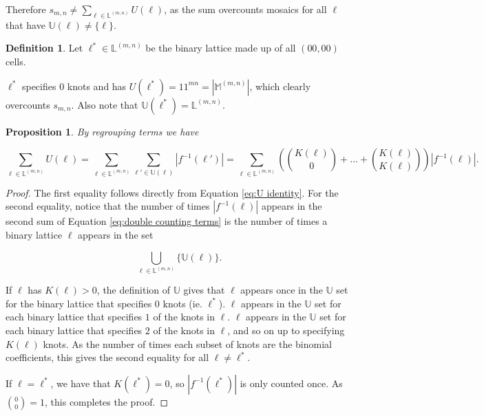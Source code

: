 \documentclass[12pt]{article}
\theoremstyle{plain}
\newtheorem{prop}[thm]{Proposition}
\theoremstyle{definition}
\newtheorem{definition}{Definition}[section]
\theoremstyle{remark}
\theoremstyle{definition}
\begin{document}
Therefore $s_{m,n} \neq \sum_{\ell \in \mathbb{L}^{(m,n)}} U(\ell)$, as the sum overcounts mosaics for all $\ell$ that have $\mathbb{U}(\ell) \neq \{\ell\}$. 

\begin{definition}
    Let $\ell^* \in \mathbb{L}^{(m,n)}$ be the binary lattice made up of all $(00,00)$ cells.
    \label{def:all zeros}
\end{definition}

$\ell^*$ specifies $0$ knots and has $U(\ell^*) = 11^{mn} = \left|\mathbb{M}^{(m,n)}\right|$, which clearly overcounts $s_{m,n}$. Also note that $\mathbb{U}(\ell^*) = \mathbb{L}^{(m,n)}$.


\begin{prop}
    By regrouping terms we have

    \begin{equation}
        \sum_{\ell \in \mathbb{L}^{(m,n)}} U(\ell) = \sum_{\ell \in \mathbb{L}^{(m,n)}}\sum_{\ell' \in \mathbb{U}(\ell)}|f^{-1}(\ell')| = \sum_{\ell \in \mathbb{L}^{(m,n)}} \left(\binom{K(\ell)}{0} + \dots + \binom{K(\ell)}{K(\ell)}\right)|f^{-1}(\ell)|.
        \label{eq:double counting terms}
    \end{equation}
\end{prop}

\begin{proof}
    The first equality follows directly from Equation \ref{eq:U identity}. For the second equality, notice that the number of times $|f^{-1}(\ell)|$ appears in the second sum of Equation \ref{eq:double counting terms} is the number of times a binary lattice $\ell$ appears in the set

    $$\bigcup_{\ell \in \mathbb{L}^{(m,n)}} \{\mathbb{U}(\ell)\}.$$
    
    If $\ell$ has $K(\ell)>0$, the definition of $\mathbb{U}$ gives that $\ell$ appears once in the $\mathbb{U}$ set for the binary lattice that specifies $0$ knots (ie. $\ell^*$). $\ell$ appears in the $\mathbb{U}$ set for each binary lattice that specifies $1$ of the knots in $\ell$. $\ell$ appears in the $\mathbb{U}$ set for each binary lattice that specifies $2$ of the knots in $\ell$, and so on up to specifying $K(\ell)$ knots. As the number of times each subset of knots are the binomial coefficients, this gives the second equality for all $\ell \neq \ell^*$.

    If $\ell = \ell^*$, we have that $K(\ell^*)=0$, so $|f^{-1}(\ell^*)|$ is only counted once. As $\binom{0}{0}=1$, this completes the proof.
\end{proof}
\end{document}
